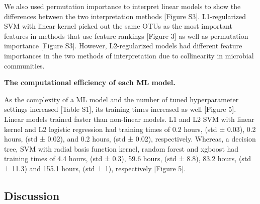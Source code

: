 \documentclass[11pt,]{article}
\begin{document}
We also used permutation importance to interpret linear models to show
the differences between the two interpretation methods {[}Figure S3{]}.
L1-regularized SVM with linear kernel picked out the same OTUs as the
most important features in methods that use feature rankings {[}Figure
3{]} as well as permutation importance {[}Figure S3{]}. However,
L2-regularized models had different feature importances in the two
methods of interpretation due to collinearity in microbial communities.

\textbf{The computational efficiency of each ML model.}

As the complexity of a ML model and the number of tuned hyperparameter
settings increased {[}Table S1{]}, its training times increased as well
{[}Figure 5{]}. Linear models trained faster than non-linear models. L1
and L2 SVM with linear kernel and L2 logistic regression had training
times of 0.2 hours, (std ± 0.03), 0.2 hours, (std ± 0.02), and 0.2
hours, (std ± 0.02), respectively. Whereas, a decision tree, SVM with
radial basis function kernel, random forest and xgboost had training
times of 4.4 hours, (std ± 0.3), 59.6 hours, (std ± 8.8), 83.2 hours,
(std ± 11.3) and 155.1 hours, (std ± 1), respectively {[}Figure 5{]}.

\subsection{Discussion}\label{discussion}
\end{document}
